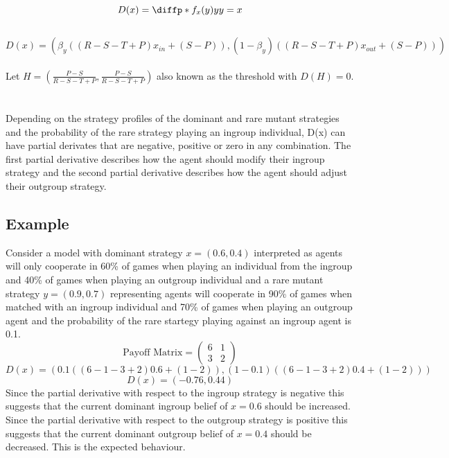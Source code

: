 \documentclass[]{llncs}
\begin{document}
\[
D(x) = \diffp*{f_x(y)}{y}{y=x}
\]
\\
\[
D(x) = (\beta_y((R - S - T + P) x_{in} + (S-P)), (1-\beta_y)((R - S - T + P) x_{out} + (S-P)))
\]
\\
Let $H = (\frac{P-S}{R - S - T +P}, \frac{P-S}{R - S - T +P}) $ also known as the threshold with $ D(H) = 0 $.\\
\\
\\
Depending on the strategy profiles of the dominant and rare mutant strategies and the probability of the rare strategy playing an ingroup individual, D(x) can have partial derivates that are negative, positive or zero in any combination. The first partial derivative describes how the agent should modify their ingroup strategy and the second partial derivative describes how the agent should adjust their outgroup strategy. 

\subsection{Example}

Consider a model with dominant strategy $x = (0.6, 0.4)$ interpreted as agents will only cooperate in 60\% of games when playing an individual from the ingroup and 40\% of games when playing an outgroup individual and a rare mutant strategy $y = (0.9, 0.7)$ representing agents will cooperate in 90\% of games when matched with an ingroup individual and 70\% of games when playing an outgroup agent and the probability of the rare startegy playing against an ingroup agent is 0.1. 
\[
   \text{Payoff Matrix} = \begin{pmatrix} 
   6 & 1  \\
   3 & 2  
   \end{pmatrix} 
\]
\[
D(x) = (0.1((6 - 1 - 3 + 2)0.6 + (1-2)), (1-0.1)((6 - 1 - 3 + 2) 0.4 + (1-2)))
\]
\[
D(x) = (-0.76, 0.44)
\]
Since the partial derivative with respect to the ingroup strategy is negative  this suggests that the current dominant ingroup belief of $x = 0.6$ should be increased. Since the partial derivative with respect to the outgroup strategy is positive this suggests that the current dominant outgroup belief of $x = 0.4$ should be decreased. This is the expected behaviour. 
\end{document}
